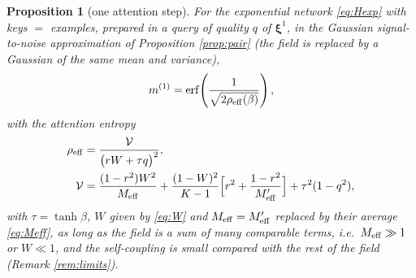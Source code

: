 \documentclass[11pt,a4paper]{article}
\newtheorem{proposition}{Proposition}
\newcommand{\x}{\bm{\xi}}
\newcommand{\Meff}{M_{\rm eff}}
\newcommand{\erf}{\mathrm{erf}}
\begin{document}
\begin{proposition}[one attention step]\label{prop:main}
For the exponential network \eqref{eq:Hexp} with keys $=$ examples, prepared in a query of quality $q$ of $\x^1$, in the Gaussian signal-to-noise approximation of Proposition \ref{prop:pair} (the field is replaced by a Gaussian of the same mean and variance),
\begin{equation}
m^{(1)}=\erf\!\left(\frac{1}{\sqrt{2\rho_{\rm eff}(\beta)}}\right),
\label{eq:main}
\end{equation}
with the attention entropy
\begin{align}
\rho_{\rm eff}&=\frac{\mathcal V}{\big(rW+\tau q\big)^2},\label{eq:rhoeff}\\
\mathcal V&=\frac{(1-r^2)W^2}{\Meff}+\frac{(1-W)^2}{K-1}\Big[r^2+\frac{1-r^2}{\Meff'}\Big]+\tau^2(1-q^2),\nonumber
\end{align}
with $\tau=\tanh\beta$, $W$ given by \eqref{eq:W} and $\Meff=\Meff'$ replaced by their average \eqref{eq:Meff}, as long as the field is a sum of many comparable terms, i.e.\ $\Meff\gg1$ or $W\ll1$, and the self-coupling is small compared with the rest of the field (Remark \ref{rem:limits}).
\end{proposition}
\end{document}
